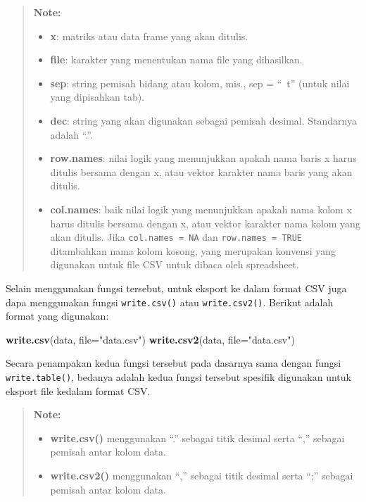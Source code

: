 \documentclass[]{book}
\newenvironment{Shaded}{\begin{snugshade}}{\end{snugshade}}
\newcommand{\KeywordTok}[1]{\textcolor[rgb]{0.13,0.29,0.53}{\textbf{#1}}}
\newcommand{\DataTypeTok}[1]{\textcolor[rgb]{0.13,0.29,0.53}{#1}}
\newcommand{\StringTok}[1]{\textcolor[rgb]{0.31,0.60,0.02}{#1}}
\newcommand{\NormalTok}[1]{#1}
\providecommand{\tightlist}{%
  \setlength{\itemsep}{0pt}\setlength{\parskip}{0pt}}
\begin{document}
\begin{quote}
\textbf{Note: }

\begin{itemize}
\tightlist
\item
  \textbf{x}: matriks atau data frame yang akan ditulis.
\item
  \textbf{file}: karakter yang menentukan nama file yang dihasilkan.
\item
  \textbf{sep}: string pemisah bidang atau kolom, mis., sep = ``~t''
  (untuk nilai yang dipisahkan tab).
\item
  \textbf{dec}: string yang akan digunakan sebagai pemisah desimal.
  Standarnya adalah ``.''.
\item
  \textbf{row.names}: nilai logik yang menunjukkan apakah nama baris x
  harus ditulis bersama dengan x, atau vektor karakter nama baris yang
  akan ditulis.
\item
  \textbf{col.names}: baik nilai logik yang menunjukkan apakah nama
  kolom x harus ditulis bersama dengan x, atau vektor karakter nama
  kolom yang akan ditulis. Jika \texttt{col.names\ =\ NA} dan
  \texttt{row.names\ =\ TRUE} ditambahkan nama kolom kosong, yang
  merupakan konvensi yang digunakan untuk file CSV untuk dibaca oleh
  spreadsheet.
\end{itemize}
\end{quote}

Selain menggunakan fungsi tersebut, untuk eksport ke dalam format CSV
juga dapa menggunakan fungsi \texttt{write.csv()} atau
\texttt{write.csv2()}. Berikut adalah format yang digunakan:

\begin{Shaded}
\begin{Highlighting}[]
\KeywordTok{write.csv}\NormalTok{(data, }\DataTypeTok{file=}\StringTok{"data.csv"}\NormalTok{)}
\KeywordTok{write.csv2}\NormalTok{(data, }\DataTypeTok{file=}\StringTok{"data.csv"}\NormalTok{)}
\end{Highlighting}
\end{Shaded}

Secara penampakan kedua fungsi tersebut pada dasarnya sama dengan fungsi
\texttt{write.table()}, bedanya adalah kedua fungsi tersebut spesifik
digunakan untuk eksport file kedalam format CSV.

\begin{quote}
\textbf{Note: }

\begin{itemize}
\tightlist
\item
  \textbf{write.csv()} menggunakan ``.'' sebagai titik desimal serta
  ``,'' sebagai pemisah antar kolom data.
\item
  \textbf{write.csv2()} menggunakan ``,'' sebagai titik desimal serta
  ``;'' sebagai pemisah antar kolom data.
\end{itemize}
\end{quote}
\end{document}
